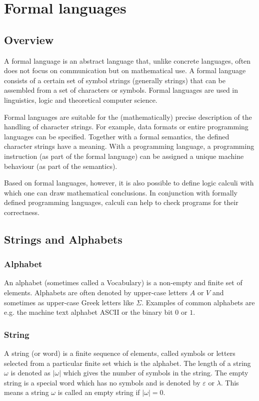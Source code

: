 \chapter{Formal languages}
\section{Overview}
A formal language is an abstract language that, unlike concrete languages, often does not focus on communication but on mathematical use. A formal language consists of a certain set of symbol strings (generally strings) that can be assembled from a set of characters or symbols. Formal languages are used in linguistics, logic and theoretical computer science.

Formal languages are suitable for the (mathematically) precise description of the handling of character strings. For example, data formats or entire programming languages can be specified. Together with a formal semantics, the defined character strings have a meaning. With a programming language, a programming instruction (as part of the formal language) can be assigned a unique machine behaviour (as part of the semantics).

Based on formal languages, however, it is also possible to define logic calculi with which one can draw mathematical conclusions. In conjunction with formally defined programming languages, calculi can help to check programs for their correctness.

\section{Strings and Alphabets}
\subsection{Alphabet}
An alphabet (sometimes called a Vocabulary) is a non-empty and finite set of elements. Alphabets are often denoted by upper-case letters $A$ or $V$ and sometimes as upper-case Greek letters like $\Sigma$. Examples of common alphabets are e.g. the machine text alphabet ASCII or the binary bit $0$ or $1$.
\subsection{String}
A string (or word) is a finite sequence of elements, called symbols or letters selected from a particular finite set which is the alphabet.
The length of a string $\omega$ is denoted as $|\omega|$ which gives the number of symbols in the string. The empty string is a special word which has no symbols and is denoted by $\varepsilon$ or $\lambda$. This means a string $\omega$ is called an empty string if $|\omega|=0$.
